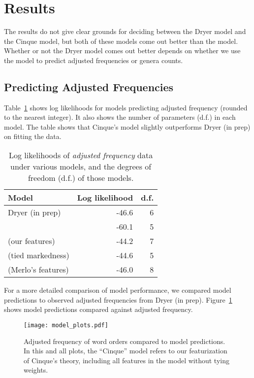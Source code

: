 \documentclass[11pt]{article}
\begin{document}
\section{Results}

The results do not give clear grounds for deciding between the Dryer model and the Cinque model, but both of these models come out better than the \citet{cysouw2010dealing} model. Whether or not the Dryer model comes out better depends on whether we use the model to predict adjusted frequencies or genera counts.

\subsection{Predicting Adjusted Frequencies}

Table~\ref{tab:af-likelihoods} shows log likelihoods for models predicting adjusted frequency (rounded to the nearest integer). It also shows the number of parameters (d.f.) in each model. The table shows that Cinque's model slightly outperforms Dryer (in prep) on fitting the data.

\begin{table}
  \centering
  \begin{tabular}{|l|r|r|}
    \hline
    Model & Log likelihood & d.f. \\
    \hline
    Dryer (in prep) & -46.6 & 6 \\
    \citet{cysouw2010dealing} & -60.1 & 5 \\
    \citet{cinque2005deriving} (our features) & -44.2 & 7 \\
    \citet{cinque2005deriving} (tied markedness) & -44.6 & 5 \\
    \citet{cinque2005deriving} (Merlo's features) & -46.0 & 8\\
    \hline
  \end{tabular}
  \caption{Log likelihoods of \emph{adjusted frequency} data under various models, and the degrees of freedom (d.f.) of those models.}
  \label{tab:af-likelihoods}
\end{table}

For a more detailed comparison of model performance, we compared model predictions to observed adjusted frequencies from Dryer (in prep). Figure~\ref{fig:af-predictions} shows model predictions compared against adjusted frequency.

\begin{figure}[ht!]
  \centering
  \texttt{[image: model\_plots.pdf]}
  \caption{Adjusted frequency of word orders compared to model predictions. In this and all plots, the ``Cinque'' model refers to our featurization of Cinque's theory, including all features in the model without tying weights.}
  \label{fig:af-predictions}
\end{figure}
\end{document}
